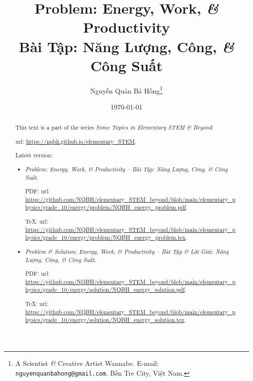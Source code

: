 \documentclass{article}
\title{Problem: Energy, Work, {\it\&} Productivity\\Bài Tập: Năng Lượng, Công, {\it\&} Công Suất}
\author{Nguyễn Quản Bá Hồng\footnote{A Scientist {\it\&} Creative Artist Wannabe. E-mail: {\tt nguyenquanbahong@gmail.com}. Bến Tre City, Việt Nam.}}
\date{\today}
\begin{document}
\maketitle
\begin{abstract}
	This text is a part of the series {\it Some Topics in Elementary STEM \& Beyond}:
	
	{\sc url}: \url{https://nqbh.github.io/elementary_STEM}.
	
	Latest version:
	\begin{itemize}
		\item {\it Problem: Energy, Work, {\it\&} Productivity -- Bài Tập: Năng Lượng, Công, {\it\&} Công Suất}.
		
		PDF: {\sc url}: \url{https://github.com/NQBH/elementary_STEM_beyond/blob/main/elementary_physics/grade_10/energy/problem/NQBH_energy_problem.pdf}.
		
		\TeX: {\sc url}: \url{https://github.com/NQBH/elementary_STEM_beyond/blob/main/elementary_physics/grade_10/energy/problem/NQBH_energy_problem.tex}.
		\item {\it Problem \& Solution: Energy, Work, {\it\&} Productivity -- Bài Tập \& Lời Giải: Năng Lượng, Công, {\it\&} Công Suất}.
		
		PDF: {\sc url}: \url{https://github.com/NQBH/elementary_STEM_beyond/blob/main/elementary_physics/grade_10/energy/solution/NQBH_energy_solution.pdf}.
		
		\TeX: {\sc url}: \url{https://github.com/NQBH/elementary_STEM_beyond/blob/main/elementary_physics/grade_10/energy/solution/NQBH_energy_solution.tex}.
	\end{itemize}
\end{abstract}
\tableofcontents

\end{document}
